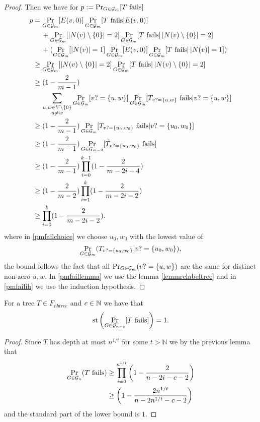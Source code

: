 \begin{proof}
Then we have for $p:=\Pr_{G\in\mathcal{G}_m}[\text{$T$ fails}]$
\begin{align}
p&=\Pr_{G\in\mathcal{G}_m}[E(v,0)]\Pr_{G\in\mathcal{G}_m}[\text{$T$ fails}|E(v,0)]\\
&\:\phantom{=}\:+\Pr_{G\in\mathcal{G}_m}[\left|{N(v)\setminus\{0\}}\right|=2]\Pr_{G\in\mathcal{G}_m}[\text{$T$ fails}|\left|{N(v)\setminus\{0\}}\right|=2]\\
&\:\phantom{=}\:+(\Pr_{G\in\mathcal{G}_m}[\left|{N(v)}\right|=1]\Pr_{G\in\mathcal{G}_m}[E(v,0)]\Pr_{G\in\mathcal{G}_m}[\text{$T$ fails}|\left|{N(v)}\right|=1])\\
&\geq \Pr_{G\in\mathcal{G}_m}[\left|{N(v)\setminus\{0\}}\right|=2]\Pr_{G\in\mathcal{G}_m}[\text{$T$ fails}|\left|{N(v)\setminus\{0\}}\right|=2]\\
&\geq (1-\frac{2}{m-1})\\
&\:\phantom{=}\:\sum_{\substack{u,w\in V\setminus \{0\} \\ u\not= w}}\Pr_{G\in\mathcal{G}_m}[v?=\{u,w\}]\Pr_{G\in\mathcal{G}_m}[T_{v?=\{u,w\}}\text{ fails}|v?=\{u,w\}]\\
&\geq(1-\frac{2}{m-1})\Pr_{G\in\mathcal{G}_m}[T_{v?=\{u_0,w_0\}}\text{ fails}|v?=\{u_0,w_0\}]\label{pmfailchoice}\\
&\geq(1-\frac{2}{m-1})\Pr_{G\in\mathcal{G}_{m-2}}[\tilde T_{v?=\{u_0,w_0\}}\text{ fails}]\label{pmfaillemma}\\
&\geq(1-\frac{2}{m-1})\prod_{i=0}^{k-1}(1-\frac{2}{m-2i-4})\label{pmfailih}\\
&\geq(1-\frac{2}{m-2})\prod_{i=1}^{k}(1-\frac{2}{m-2i-2})\\
&\geq\prod_{i=0}^{k}(1-\frac{2}{m-2i-2}).
\end{align}
where in \eqref{pmfailchoice} we choose $u_0,w_0$ with the lowest value of \[\Pr_{G\in\mathcal{G}_m}(\text{$T_{v?=\{u_0,w_0\}}|v?=\{u_0,w_0\}$}),\] the bound follows the fact that all $\Pr_{G\in\mathcal{G}_m}(v?=\{u,w\})$ are the same for distinct non-zero $u,w$. In \eqref{pmfaillemma} we use the lemma \ref{lemmrelabeltree} and in \eqref{pmfailih} we use the induction hypothesis.
\end{proof}

\begin{crll}\label{crllpPathtreefail}
For a tree $T\in F_{nbtree}$ and $c\in \mathbb{N}$ we have that
\[\text{st}\left(\Pr_{G\in\mathcal{G}_{n-c}}[T\text{ fails}]\right)= 1.\]
\end{crll}
\begin{proof}
Since $T$ has depth at most $n^{1/t}$ for some $t>\mathbb{N}$ we by the previous lemma that
\begin{align}
\Pr_{G\in\mathcal{G}_n}(\text{$T$ fails})&\geq \prod_{i=0}^{n^{1/t}}\left(1-\frac{2}{n-2i-c-2}\right)\\
&\geq \left(1-\frac{2n^{1/t}}{n-2n^{1/t}-c-2}\right)
\end{align}
and the standard part of the lower bound is $1$.
\end{proof}

